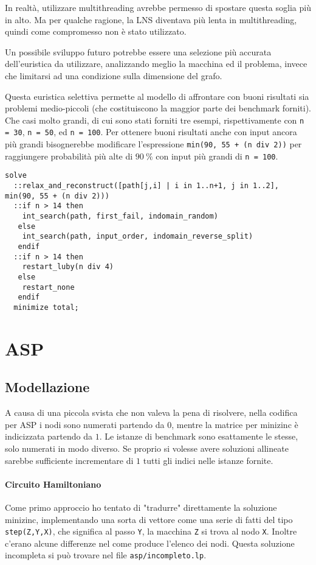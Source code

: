 \documentclass[12pt, a4paper]{article}
\begin{document}
In realtà, utilizzare multithreading avrebbe permesso di spostare questa soglia più in alto. Ma per qualche ragione, la LNS diventava più lenta in multithreading, quindi come compromesso non è stato utilizzato.

Un possibile sviluppo futuro potrebbe essere una selezione più accurata dell'euristica da utilizzare, analizzando meglio la macchina ed il problema, invece che limitarsi ad una condizione sulla dimensione del grafo.

Questa euristica selettiva permette al modello di affrontare con buoni risultati sia problemi medio-piccoli (che costituiscono la maggior parte dei benchmark forniti). Che casi molto grandi, di cui sono stati forniti tre esempi, rispettivamente con \lstinline{n = 30}, \lstinline{n = 50}, ed \lstinline{n = 100}.
Per ottenere buoni risultati anche con input ancora più grandi bisognerebbe modificare l'espressione \lstinline{min(90, 55 + (n div 2))} per raggiungere probabilità più alte di $\qty{90}{\percent}$ con input più grandi di \lstinline{n = 100}.

\begin{lstlisting}[language=minizinc]
solve 
  ::relax_and_reconstruct([path[j,i] | i in 1..n+1, j in 1..2], min(90, 55 + (n div 2)))
  ::if n > 14 then 
    int_search(path, first_fail, indomain_random) 
   else 
    int_search(path, input_order, indomain_reverse_split) 
   endif
  ::if n > 14 then
    restart_luby(n div 4) 
   else 
    restart_none
   endif
  minimize total;
\end{lstlisting}

\section{ASP}

\subsection{Modellazione}

A causa di una piccola svista che non valeva la pena di risolvere, nella codifica per ASP i nodi sono numerati partendo da $0$, mentre la matrice per minizinc è indicizzata partendo da $1$.
Le istanze di benchmark sono esattamente le stesse, solo numerati in modo diverso.
Se proprio si volesse avere soluzioni allineate sarebbe sufficiente incrementare di $1$ tutti gli indici nelle istanze fornite.

\paragraph{Circuito Hamiltoniano}
Come primo approccio ho tentato di "tradurre" direttamente la soluzione minizinc, implementando una sorta di vettore come una serie di fatti del tipo \lstinline{step(Z,Y,X)}, che significa al passo \lstinline{Y}, la macchina \lstinline{Z} si trova al nodo \lstinline{X}.
Inoltre c'erano alcune differenze nel come produce l'elenco dei nodi.
Questa soluzione incompleta si può trovare nel file \lstinline{asp/incompleto.lp}.
\end{document}
